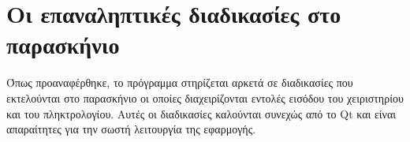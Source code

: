 \section{Οι επαναληπτικές διαδικασίες στο παρασκήνιο}

Όπως προαναφέρθηκε, το πρόγραμμα στηρίζεται αρκετά σε διαδικασίες που εκτελούνται στο παρασκήνιο
οι οποίες διαχειρίζονται εντολές εισόδου του χειριστηρίου και του πληκτρολογίου. Αυτές οι διαδικασίες
καλούνται συνεχώς από το Qt και είναι απαραίτητες για την σωστή λειτουργία της εφαρμογής. 










\begin{lstlisting}[language=C++, style=cppstyle]

\end{lstlisting}